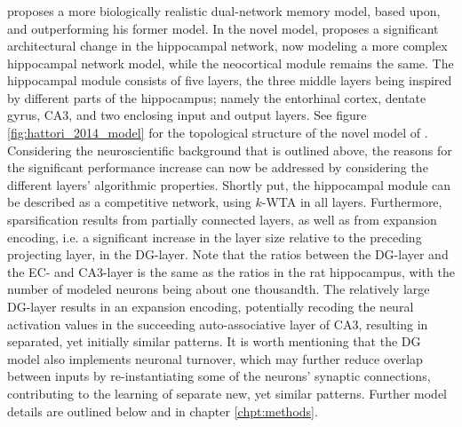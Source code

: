\subsubsection{\cite{Hattori2014}}
\cite{Hattori2014} proposes a more biologically realistic dual-network memory model, based upon, and outperforming his former model. In the novel model, \cite{Hattori2014} proposes a significant architectural change in the hippocampal network, now modeling a more complex hippocampal network model, while the neocortical module remains the same. The hippocampal module consists of five layers, the three middle layers being inspired by different parts of the hippocampus; namely the entorhinal cortex, dentate gyrus, CA3, and two enclosing input and output layers. See figure \ref{fig:hattori_2014_model} for the topological structure of the novel model of \cite{Hattori2014}. 
Considering the neuroscientific background that is outlined above, the reasons for the significant performance increase can now be addressed by considering the different layers' algorithmic properties. 
Shortly put, the hippocampal module can be described as a competitive network, using $k$-WTA in all layers. Furthermore, sparsification results from partially connected layers, as well as from expansion encoding, i.e. a significant increase in the layer size relative to the preceding projecting layer, in the DG-layer. Note that the ratios between the DG-layer and the EC- and CA3-layer is the same as the ratios in the rat hippocampus, with the number of modeled neurons being about one thousandth. The relatively large DG-layer results in an expansion encoding, potentially recoding the neural activation values in the succeeding auto-associative layer of CA3, resulting in separated, yet initially similar patterns. It is worth mentioning that the DG model also implements neuronal turnover, which may further reduce overlap between inputs by re-instantiating some of the neurons' synaptic connections, contributing to the learning of separate new, yet similar patterns. Further model details are outlined below and in chapter \ref{chpt:methods}.


